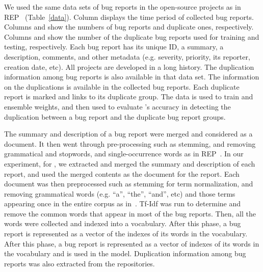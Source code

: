 We used the same data sets of bug reports in the open-source projects
as in REP~\cite{sun-ase11} (Table~\ref{data}). Column  displays the time period of collected bug reports. Columns
 and  show the numbers of bug reports and
duplicate ones, respectively. Columns  and 
show the number of the duplicate bug reports used for training and
testing, respectively.  Each bug report has its unique ID, a summary,
a description, comments, and other metadata (e.g. severity, priority,
its reporter, creation date, etc). All projects are developed in a
long history.  The duplication information among bug reports is also
available in that data set. The information on the duplications is
available in the collected bug reports. Each duplicate report is
marked and links to its duplicate group. The data is used to train
{\model} and ensemble weights, and then used to evaluate {\model}'s
accuracy in detecting the duplication between a bug report and the
duplicate bug report groups.



The summary and description of a bug report were merged and considered
as a document. It then went through pre-processing such as stemming,
and removing grammatical and stopwords, and single-occurrence words
as in REP~\cite{sun-ase11}.
In our experiment, for {\model}, we extracted and merged the summary
and description of each report, and used the merged contents as the
document for the report. Each document was then preprocessed such as
stemming for term normalization, and removing grammatical words
(e.g. ``a'', ``the'', ``and'', etc) and those terms appearing once in
the entire corpus as in~\cite{RTM}. Tf-Idf was run to determine and
remove the common words that appear in most of the bug reports.
Then, all the words were collected and indexed into a vocabulary.
After this phase, a bug report is represented as a vector of the
indexes of its words in the vocabulary. After this phase, a bug report is
represented as a vector of indexes of its words in the vocabulary and
is used in the model. Duplication information among bug reports was
also extracted from the repositories.

